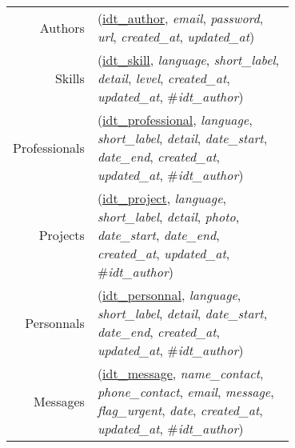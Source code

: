 
\usepackage[normalem]{ulem}
\newenvironment{mld}
  {\par\begin{minipage}{\linewidth}\begin{tabular}{rp{0.7\linewidth}}}
  {\end{tabular}\end{minipage}\par}
\newcommand{\relat}[1]{\textsc{#1}}
\newcommand{\attr}[1]{\emph{#1}}
\newcommand{\prim}[1]{\uline{#1}}
\newcommand{\foreign}[1]{\#\textsl{#1}}


\begin{mld}
  Authors & (\prim{idt\_author}, \attr{email}, \attr{password}, \attr{url}, \attr{created\_at}, \attr{updated\_at})\\
  Skills & (\prim{idt\_skill}, \attr{language}, \attr{short\_label}, \attr{detail}, \attr{level}, \attr{created\_at}, \attr{updated\_at}, \foreign{idt\_author})\\
  Professionals & (\prim{idt\_professional}, \attr{language}, \attr{short\_label}, \attr{detail}, \attr{date\_start}, \attr{date\_end}, \attr{created\_at}, \attr{updated\_at}, \foreign{idt\_author})\\
  Projects & (\prim{idt\_project}, \attr{language}, \attr{short\_label}, \attr{detail}, \attr{photo}, \attr{date\_start}, \attr{date\_end}, \attr{created\_at}, \attr{updated\_at}, \foreign{idt\_author})\\
  Personnals & (\prim{idt\_personnal}, \attr{language}, \attr{short\_label}, \attr{detail}, \attr{date\_start}, \attr{date\_end}, \attr{created\_at}, \attr{updated\_at}, \foreign{idt\_author})\\
  Messages & (\prim{idt\_message}, \attr{name\_contact}, \attr{phone\_contact}, \attr{email}, \attr{message}, \attr{flag\_urgent}, \attr{date}, \attr{created\_at}, \attr{updated\_at}, \foreign{idt\_author})\\
\end{mld}